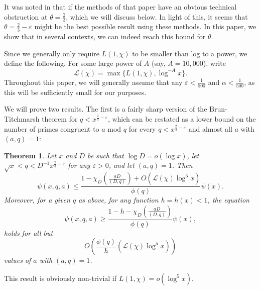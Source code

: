 \documentclass{amsart}
\newtheorem{theorem}{Theorem}[section]
\begin{document}
It was noted in \cite{FI03} that if the methods of that paper have an obvious technical obstruction at $\theta=\frac 23$, which we will discuss below.  In light of this, it seems that $\theta=\frac 23-\varepsilon$ might be the best possible result using these methods.  In this paper, we show that in several contexts, we can indeed reach this bound for $\theta$.

Since we generally only require $L(1,\chi)$ to be smaller than log to a power, we define the following.  For some large power of $A$ (say, $A=10,000$), write
$$\mathcal L(\chi)=\max\{L(1,\chi),\log^{-A}x\}.$$
Throughout this paper, we will generally assume that any $\varepsilon<\frac{1}{500}$ and $\alpha<\frac{1}{500}$, as this will be sufficiently small for our purposes.



We will prove two results.  The first is a fairly sharp version of the Brun-Titchmarsh theorem for $q<x^{\frac 23-\varepsilon}$, which can be restated as a lower bound on the number of primes congruent to $a$ mod $q$ for every $q<x^{\frac 23-\varepsilon}$ and almost all $a$ with $(a,q)=1$:




\begin{theorem}\label{Main1}
Let $x$ and $D$ be such that $\log D=o(\log x)$, let $\sqrt x<q<D^{-1}x^{\frac 23-\varepsilon}$ for any $\varepsilon>0$, and let $(a,q)=1$.
Then
$$\psi(x,q,a)\leq \frac{1-\chi_D\left(\frac{aD}{(D,q)}\right)+O\left(\mathcal L(\chi)\log^5 x\right)}{\phi(q)}\psi(x).$$
Moreover, for a given $q$ as above, for any function $h=h(x)<1$, the equation
$$\psi(x,q,a)\geq \frac{1-h-\chi_D\left(\frac{aD}{(D,q)}\right)}{\phi(q)}\psi(x),$$
holds for all but $$O\left(\frac{\phi(q)}{h}\left(\mathcal L(\chi)\log^5 x\right)\right)$$values of $a$ with $(a,q)=1$.
\end{theorem}
This result is obviously non-trivial if $L(1,\chi)=o\left(\log^5 x\right)$.
\end{document}
